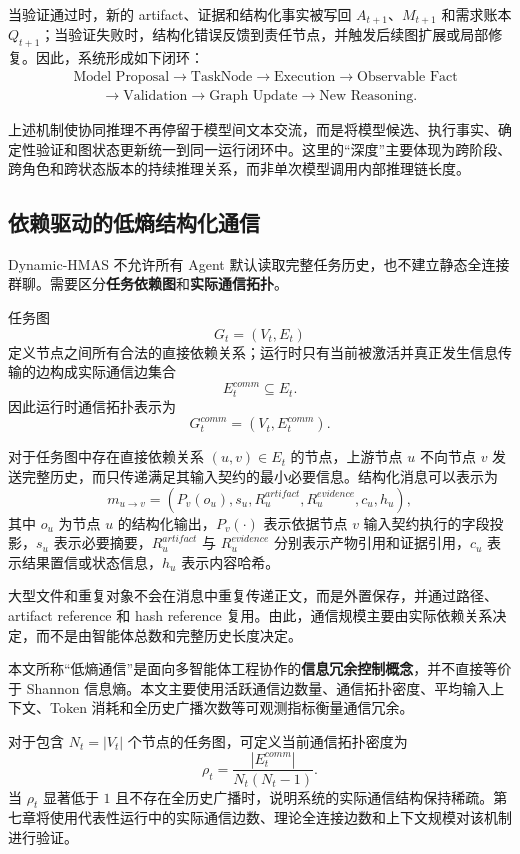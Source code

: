 \documentclass[UTF8,a4paper,12pt,oneside]{ctexbook}
\begin{document}
当验证通过时，新的 artifact、证据和结构化事实被写回 $A_{t+1}$、$M_{t+1}$ 和需求账本 $Q_{t+1}$；当验证失败时，结构化错误反馈到责任节点，并触发后续图扩展或局部修复。因此，系统形成如下闭环：
\[
\begin{aligned}
&\text{Model Proposal}
\rightarrow \text{TaskNode}
\rightarrow \text{Execution}
\rightarrow \text{Observable Fact} \\[3pt]
&\qquad\rightarrow \text{Validation}
\rightarrow \text{Graph Update}
\rightarrow \text{New Reasoning}.
\end{aligned}
\]

上述机制使协同推理不再停留于模型间文本交流，而是将模型候选、执行事实、确定性验证和图状态更新统一到同一运行闭环中。这里的“深度”主要体现为跨阶段、跨角色和跨状态版本的持续推理关系，而非单次模型调用内部推理链长度。


\subsection{依赖驱动的低熵结构化通信}

Dynamic-HMAS 不允许所有 Agent 默认读取完整任务历史，也不建立静态全连接群聊。需要区分\textbf{任务依赖图}和\textbf{实际通信拓扑}。

任务图
\[
G_t=(V_t,E_t)
\]
定义节点之间所有合法的直接依赖关系；运行时只有当前被激活并真正发生信息传输的边构成实际通信边集合
\[
E_t^{comm}\subseteq E_t.
\]
因此运行时通信拓扑表示为
\[
G_t^{comm}
=
(V_t,E_t^{comm}).
\]

对于任务图中存在直接依赖关系 $(u,v)\in E_t$ 的节点，上游节点 $u$ 不向节点 $v$ 发送完整历史，而只传递满足其输入契约的最小必要信息。结构化消息可以表示为
\[
m_{u\rightarrow v}
=
\left(
P_v(o_u),
s_u,
R_u^{artifact},
R_u^{evidence},
c_u,
h_u
\right),
\]
其中 $o_u$ 为节点 $u$ 的结构化输出，$P_v(\cdot)$ 表示依据节点 $v$ 输入契约执行的字段投影，$s_u$ 表示必要摘要，$R_u^{artifact}$ 与 $R_u^{evidence}$ 分别表示产物引用和证据引用，$c_u$ 表示结果置信或状态信息，$h_u$ 表示内容哈希。

大型文件和重复对象不会在消息中重复传递正文，而是外置保存，并通过路径、artifact reference 和 hash reference 复用。由此，通信规模主要由实际依赖关系决定，而不是由智能体总数和完整历史长度决定。

本文所称“低熵通信”是面向多智能体工程协作的\textbf{信息冗余控制概念}，并不直接等价于 Shannon 信息熵。本文主要使用活跃通信边数量、通信拓扑密度、平均输入上下文、Token 消耗和全历史广播次数等可观测指标衡量通信冗余。

对于包含 $N_t=|V_t|$ 个节点的任务图，可定义当前通信拓扑密度为
\[
\rho_t
=
\frac{|E_t^{comm}|}
{N_t(N_t-1)}.
\]
当 $\rho_t$ 显著低于 $1$ 且不存在全历史广播时，说明系统的实际通信结构保持稀疏。第七章将使用代表性运行中的实际通信边数、理论全连接边数和上下文规模对该机制进行验证。
\end{document}
